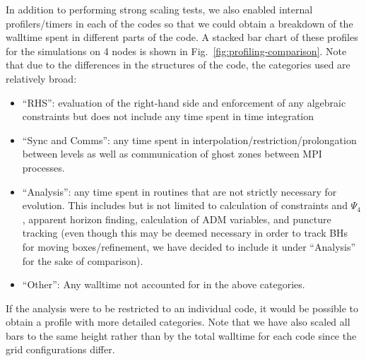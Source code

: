 \documentclass[12pt,a4paper]{article}
\numberwithin{figure}{subsection}
\begin{document}
In addition to performing strong scaling tests, we also enabled internal
profilers/timers in each of the codes so that we could obtain a breakdown of the
walltime spent in different parts of the code. A stacked bar chart of these
profiles for the simulations on 4 nodes is shown in
Fig.~\ref{fig:profiling-comparison}. Note that due to the differences in the
structures of the code, the categories used are relatively broad:
\begin{itemize}
    \item ``RHS'': evaluation of the right-hand side and enforcement of any
    algebraic constraints but does not include any time spent in time
    integration
    \item ``Sync and Comms'': any time spent in
    interpolation/restriction/prolongation between levels as well as
    communication of ghost zones between MPI processes.
    \item ``Analysis'': any time spent in routines that are not strictly
    necessary for evolution. This includes but is not limited to calculation of
    constraints and $\Psi_4$, apparent horizon finding, calculation of ADM
    variables, and puncture tracking (even though this may be deemed necessary
    in order to track BHs for moving boxes/refinement, we have decided to
    include it under ``Analysis'' for the sake of comparison).
    \item ``Other'': Any walltime not accounted for in the above categories.
\end{itemize}
If the analysis were to be restricted to an individual code, it would be
possible to obtain a profile with more detailed categories. Note that we have
also scaled all bars to the same height rather than by the total walltime for
each code since the grid configurations differ.
\end{document}
